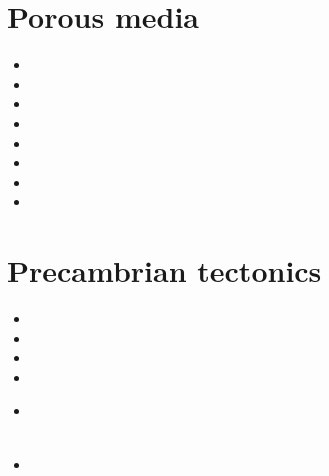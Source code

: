 \section{Porous media} 

\begin{scriptsize}
\begin{itemize}
\item[\nineteeneightysix] 
\item[\nineteeneightyeight] 
\item[\nineteenninetythree] 
\item[\nineteenninetynine] 
\item[\twothousand] 
\item[\twothousandthirteen] 
\item[\twothousandnineteen] 
\item[\twothousandtwenty] 
\end{itemize}
\end{scriptsize}

\section{Precambrian tectonics}

\begin{scriptsize}
\begin{itemize}
\item[\nineteenninetyfour] 
\item[\twothousandthree] 
\item[\twothousandten] 
\item[\twothousandeleven] 
\item[\twothousandfourteen] 
 \\
 \\
\item[\twothousandtwenty] 
\end{itemize}
\end{scriptsize}

